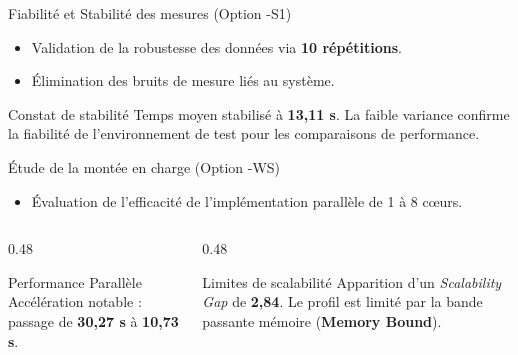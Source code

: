 \begin{frame}{Fiabilité et Stabilité des mesures (Option -S1)}
    \begin{itemize}
        \fontsize{8}{9}\selectfont
        \item Validation de la robustesse des données via \textbf{10 répétitions}.
        \item Élimination des bruits de mesure liés au système.
    \end{itemize}
    
    
    \vspace{-0.5cm}
    \begin{block}{\footnotesize Constat de stabilité}
        \fontsize{7}{8}\selectfont
        Temps moyen stabilisé à \textbf{13,11 s}. La faible variance confirme la fiabilité de l'environnement de test pour les comparaisons de performance.
    \end{block}
\end{frame}

\begin{frame}{Étude de la montée en charge (Option -WS)}
    \begin{itemize}
        \fontsize{8}{9}\selectfont
        \item Évaluation de l'efficacité de l'implémentation parallèle de 1 à 8 cœurs.
    \end{itemize}
    
    
    \vspace{-0.5cm}
    \begin{columns}[T]
        \begin{column}{0.48\textwidth}
            \begin{block}{\footnotesize Performance Parallèle}
                \fontsize{7}{8}\selectfont
                Accélération notable : passage de \textbf{30,27 s} à \textbf{10,73 s}.
            \end{block}
        \end{column}
        \begin{column}{0.48\textwidth}
            \begin{alertblock}{\footnotesize Limites de scalabilité}
                \fontsize{7}{8}\selectfont
                Apparition d'un \textit{Scalability Gap} de \textbf{2,84}. Le profil est limité par la bande passante mémoire (\textbf{Memory Bound}).
            \end{alertblock}
        \end{column}
    \end{columns}
\end{frame}

